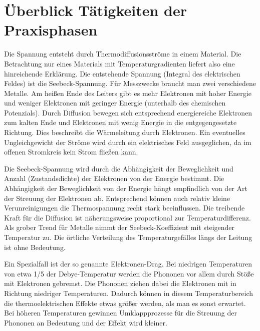 \chapter*{Überblick Tätigkeiten der Praxisphasen} %

Die Spannung entsteht durch Thermodiffusionsströme in einem Material. Die Betrachtung nur eines Materials mit Temperaturgradienten liefert also eine hinreichende Erklärung. Die entstehende Spannung (Integral des elektrischen Feldes) ist die Seebeck-Spannung. Für Messzwecke braucht man zwei verschiedene Metalle. Am heißen Ende des Leiters gibt es mehr Elektronen mit hoher Energie und weniger Elektronen mit geringer Energie (unterhalb des chemischen Potenzials). Durch Diffusion bewegen sich entsprechend energiereiche Elektronen zum kalten Ende und Elektronen mit wenig Energie in die entgegengesetzte Richtung. Dies beschreibt die Wärmeleitung durch Elektronen. Ein eventuelles Ungleichgewicht der Ströme wird durch ein elektrisches Feld ausgeglichen, da im offenen Stromkreis kein Strom fließen kann.

Die Seebeck-Spannung wird durch die Abhängigkeit der Beweglichkeit und Anzahl (Zustandsdichte) der Elektronen von der Energie bestimmt. Die Abhängigkeit der Beweglichkeit von der Energie hängt empfindlich von der Art der Streuung der Elektronen ab. Entsprechend können auch relativ kleine Verunreinigungen die Thermospannung recht stark beeinflussen. Die treibende Kraft für die Diffusion ist näherungsweise proportional zur Temperaturdifferenz. Als grober Trend für Metalle nimmt der Seebeck-Koeffizient mit steigender Temperatur zu. Die örtliche Verteilung des Temperaturgefälles längs der Leitung ist ohne Bedeutung.

Ein Spezialfall ist der so genannte Elektronen-Drag. Bei niedrigen Temperaturen von etwa 1/5 der Debye-Temperatur werden die Phononen vor allem durch Stöße mit Elektronen gebremst. Die Phononen ziehen dabei die Elektronen mit in Richtung niedriger Temperaturen. Dadurch können in diesem Temperaturbereich die thermoelektrischen Effekte etwas größer werden, als man es sonst erwartet. Bei höheren Temperaturen gewinnen Umklappprozesse für die Streuung der Phononen an Bedeutung und der Effekt wird kleiner.
\cleardoublepage
